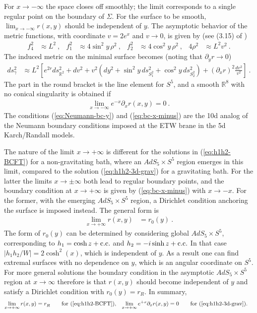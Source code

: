 \documentclass[aps,prd,11pt,notitlepage,longbibliography,nofootinbib,tightenlines,preprintnumbers]{revtex4-1}
\def\RR{{\mathds{R}}}
\begin{document}
For $x\rightarrow -\infty$ the space closes off smoothly; the limit corresponds to a single regular point on the boundary of $\Sigma$. For the surface to be smooth,  $\lim_{x\rightarrow -\infty}r(x,y)$ should be independent of $y$.
The asymptotic behavior of the metric functions, with coordinate $v=2e^{x}$ and $v\rightarrow 0$, is given by (see (3.15) of \cite{Assel:2011xz})
\begin{align}
	f_4^2&\approx L^2~, & f_1^2&\approx 4\sin^2\!y\,\rho^2~, & f_2^2&\approx 4\cos^2\!y\,\rho^2~, & 4\rho^2&\approx L^2v^2~.
\end{align}
The induced metric on the minimal surface becomes (noting that $\partial_y r\rightarrow 0$)
\begin{align}
	ds^2_\gamma&\approx L^2\left[ e^{2r}ds^2_{\RR^2}+dv^2+v^2\left(dy^2+\sin^2\!y\, ds^2_{S_1^2}+\cos^2\!y\,ds^2_{S_2^2}\right)+(\partial_x r)^2\frac{dv^2}{v^2}\right]~.
\end{align}
The part in the round bracket is the line element for $S^5$, and a smooth $\RR^8$ with no conical singularity is obtained if
\begin{align}\label{eq:bc-x-minus}
	\lim_{x\rightarrow-\infty}e^{-x}\partial_x r(x,y)=0~.
\end{align}
The conditions (\ref{eq:Neumann-bc-y}) and (\ref{eq:bc-x-minus}) are the 10d analog of the Neumann boundary conditions imposed at the ETW brane in the 5d Karch/Randall models.

The nature of the limit $x\rightarrow +\infty$ is different for the solutions in (\ref{eq:h1h2-BCFT}) for a non-gravitating bath, where an $AdS_5\times S^5$ region emerges in this limit, compared to the solution (\ref{eq:h1h2-3d-grav}) for a gravitating bath.
For the latter the limits $x\rightarrow \pm \infty$ both lead to regular boundary points, and the boundary condition at $x\rightarrow+\infty$ is given by (\ref{eq:bc-x-minus}) with $x\rightarrow -x$.
For the former, with the emerging $AdS_5\times S^5$ region, a Dirichlet condition anchoring the surface is imposed instead. 
The general form is 
\begin{align}
	\lim_{x\rightarrow+\infty} r(x,y)&=r_0(y)~.
\end{align}
The form of $r_0(y)$ can be determined by considering global $AdS_5\times S^5$, corresponding to $h_1=\cosh z+\rm{c.c.}$ and $h_2=-i \sinh z+\rm{c.c.}$ 
In that case $|h_1h_2/W|=2\cosh^2(x)$, which is independent of $y$.
As a result one can find extremal surfaces with no dependence on $y$, which is an angular coordinate on $S^5$.
For more general solutions the  boundary condition in the asymptotic $AdS_5\times S^5$ region at $x\rightarrow\infty$ therefore is that $r(x,y)$ should become independent of $y$ and satisfy a Dirichlet condition with $r_0(y)=r_R$. In summary,
\begin{align}\label{eq:Dirichlet}
	\lim_{x\rightarrow+\infty}r(x,y)&=r^{}_R\qquad \text{for (\ref{eq:h1h2-BCFT}),}
	&
	\lim_{x\rightarrow+\infty}e^{+x}\partial_x r(x,y)&=0 \qquad \text{for (\ref{eq:h1h2-3d-grav}).}
\end{align}
\end{document}
